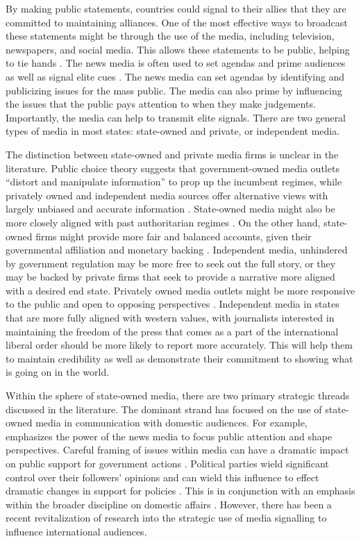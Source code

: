 \documentclass[12pt]{article}
\begin{document}
By making public statements, countries could signal to their allies that they are committed to maintaining alliances. One of the most effective ways to broadcast these statements might be through the use of the media, including television, newspapers, and social media. This allows these statements to be public, helping to tie hands \citep{fearon_signaling_1997}. The news media is often used to set agendas and prime audiences as well as signal elite cues \citep{iyengar_news_2010, chong_framing_2007}. The news media can set agendas by identifying and publicizing issues for the mass public. The media can also prime by influencing the issues that the public pays attention to when they make judgements. Importantly, the media can help to transmit elite signals. There are two general types of media in most states: state-owned and private, or independent media. 

The distinction between state-owned and private media firms is unclear in the literature. Public choice theory suggests that government-owned media outlets “distort and manipulate information” to prop up the incumbent regimes, while privately owned and independent media sources offer alternative views with largely unbiased and accurate information \citep{djankov_who_2003}. State-owned media might also be more closely aligned with past authoritarian regimes \citep{moehler_whose_2011}. On the other hand, state-owned firms might provide more fair and balanced accounts, given their governmental affiliation and monetary backing \citep{djankov_who_2003}. Independent media, unhindered by government regulation may be more free to seek out the full story, or they may be backed by private firms that seek to provide a narrative more aligned with a desired end state. Privately owned media outlets might be more responsive to the public and open to opposing perspectives \citep{moehler_whose_2011}. Independent media in states that are more fully aligned with western values, with journalists interested in maintaining the freedom of the press that comes as a part of the international liberal order should be more likely to report more accurately. This will help them to maintain credibility as well as demonstrate their commitment to showing what is going on in the world. 

Within the sphere of state-owned media, there are two primary strategic threads discussed in the literature. The dominant strand has focused on the use of state-owned media in communication with domestic audiences. For example, \citet{mccombs_agenda-setting_2002} emphasizes the power of the news media to focus public attention and shape perspectives. Careful framing of issues within media can have a dramatic impact on public support for government actions \citep{gershkoff_shaping_2005}. Political parties wield significant control over their followers' opinions and can wield this influence to effect dramatic changes in support for policies \citep{slothuus_how_2021}. This is in conjunction with an emphasis within the broader discipline on domestic affairs \citep{tomz_public_2020, de_mesquita_testing_2004}. However, there has been a recent revitalization of research into the strategic use of media signalling to influence international audiences. 
\end{document}
